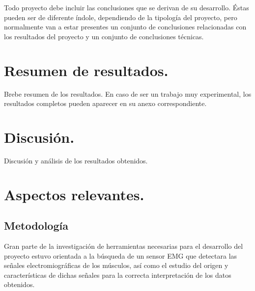 
Todo proyecto debe incluir las conclusiones que se derivan de su desarrollo. Éstas pueden ser de diferente índole, dependiendo de la tipología del proyecto, pero normalmente van a estar presentes un conjunto de conclusiones relacionadas con los resultados del proyecto y un conjunto de conclusiones técnicas. 

\section{Resumen de resultados.}

Brebe resumen de los resultados. En caso de ser un trabajo muy experimental, los resultados completos pueden aparecer en su anexo correspondiente.

\section{Discusión.}

Discusión y análisis de los resultados obtenidos.


\section{Aspectos relevantes.}





\subsection{Metodología}

Gran parte de la investigación de herramientas necesarias para el desarrollo del proyecto estuvo orientada a la búsqueda de un sensor EMG que detectara las señales electromiográficas de los músculos, así como el estudio del origen y características de dichas señales para la correcta interpretación de los datos obtenidos. 

